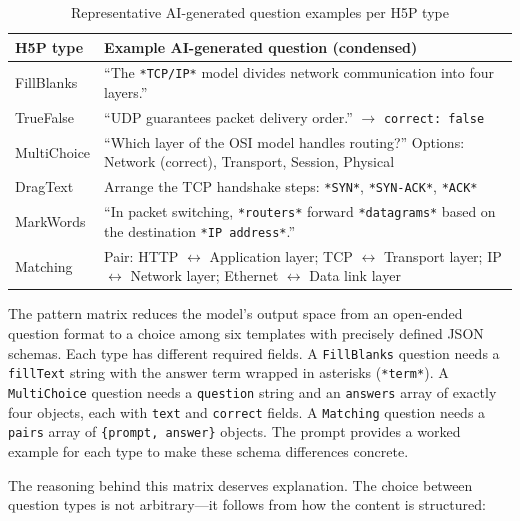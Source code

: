 \begin{table}[H]
  \centering
  \small
  \begin{tabularx}{\linewidth}{
    >{\raggedright\arraybackslash}p{2.4cm}
    >{\raggedright\arraybackslash}X
  }
    \toprule
    \textbf{H5P type} & \textbf{Example AI-generated question (condensed)} \\
    \midrule
    FillBlanks    & ``The \texttt{*TCP/IP*} model divides network communication into four layers.'' \\
    \addlinespace
    TrueFalse     & ``UDP guarantees packet delivery order.'' $\rightarrow$ \texttt{correct: false} \\
    \addlinespace
    MultiChoice   & ``Which layer of the OSI model handles routing?'' Options: Network (correct), Transport, Session, Physical \\
    \addlinespace
    DragText      & Arrange the TCP handshake steps: \texttt{*SYN*}, \texttt{*SYN-ACK*}, \texttt{*ACK*} \\
    \addlinespace
    MarkWords     & ``In packet switching, \texttt{*routers*} forward \texttt{*datagrams*} based on the destination \texttt{*IP address*}.'' \\
    \addlinespace
    Matching      & Pair: HTTP $\leftrightarrow$ Application layer; TCP $\leftrightarrow$ Transport layer; IP $\leftrightarrow$ Network layer; Ethernet $\leftrightarrow$ Data link layer \\
    \bottomrule
  \end{tabularx}
  \caption{Representative AI-generated question examples per H5P type}
  \label{tab:pattern_examples}
\end{table}

The pattern matrix reduces the model's output space from an open-ended question format to a choice among six templates with precisely defined JSON schemas. Each type has different required fields. A \texttt{FillBlanks} question needs a \texttt{fillText} string with the answer term wrapped in asterisks (\texttt{*term*}). A \texttt{MultiChoice} question needs a \texttt{question} string and an \texttt{answers} array of exactly four objects, each with \texttt{text} and \texttt{correct} fields. A \texttt{Matching} question needs a \texttt{pairs} array of \texttt{\{prompt, answer\}} objects. The prompt provides a worked example for each type to make these schema differences concrete.

The reasoning behind this matrix deserves explanation. The choice between question types is not arbitrary---it follows from how the content is structured:

